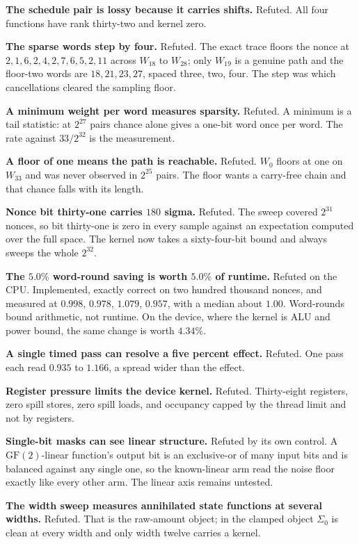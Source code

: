 \textbf{The schedule pair is lossy because it carries shifts.} Refuted. All four functions have rank thirty-two and kernel zero.

\textbf{The sparse words step by four.} Refuted. The exact trace floors the nonce at \(2, 1, 6, 2, 4, 2, 7, 6, 5, 2, 11\) across \(W_{18}\) to \(W_{28}\); only \(W_{19}\) is a genuine path and the floor-two words are \(18, 21, 23, 27\), spaced three, two, four. The step was which cancellations cleared the sampling floor.

\textbf{A minimum weight per word measures sparsity.} Refuted. A minimum is a tail statistic: at \(2^{27}\) pairs chance alone gives a one-bit word once per word. The rate against \(33/2^{32}\) is the measurement.

\textbf{A floor of one means the path is reachable.} Refuted. \(W_0\) floors at one on \(W_{33}\) and was never observed in \(2^{25}\) pairs. The floor wants a carry-free chain and that chance falls with its length.

\textbf{Nonce bit thirty-one carries \(180\) sigma.} Refuted. The sweep covered \(2^{31}\) nonces, so bit thirty-one is zero in every sample against an expectation computed over the full space. The kernel now takes a sixty-four-bit bound and always sweeps the whole \(2^{32}\).

\textbf{The \(5.0\%\) word-round saving is worth \(5.0\%\) of runtime.} Refuted on the CPU. Implemented, exactly correct on two hundred thousand nonces, and measured at \(0.998\), \(0.978\), \(1.079\), \(0.957\), with a median about \(1.00\). Word-rounds bound arithmetic, not runtime. On the device, where the kernel is ALU and power bound, the same change is worth \(4.34\%\).

\textbf{A single timed pass can resolve a five percent effect.} Refuted. One pass each read \(0.935\) to \(1.166\), a spread wider than the effect.

\textbf{Register pressure limits the device kernel.} Refuted. Thirty-eight registers, zero spill stores, zero spill loads, and occupancy capped by the thread limit and not by registers.

\textbf{Single-bit masks can see linear structure.} Refuted by its own control. A \(\mathrm{GF}(2)\)-linear function's output bit is an exclusive-or of many input bits and is balanced against any single one, so the known-linear arm read the noise floor exactly like every other arm. The linear axis remains untested.

\textbf{The width sweep measures annihilated state functions at several widths.} Refuted. That is the raw-amount object; in the clamped object \(\Sigma_0\) is clean at every width and only width twelve carries a kernel.

